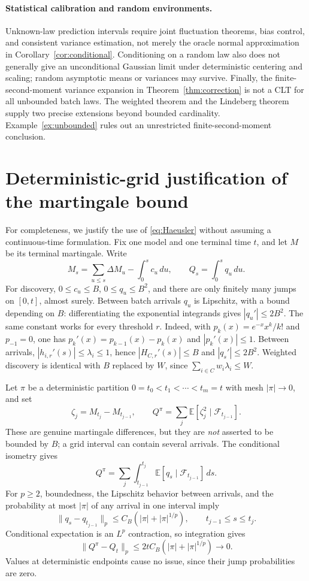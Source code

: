 \documentclass[11pt]{article}
\numberwithin{equation}{section}
\theoremstyle{definition}
\theoremstyle{remark}
\newcommand{\E}{\mathbb E}
\begin{document}
\paragraph{Statistical calibration and random environments.}
Unknown-law prediction intervals require joint fluctuation theorems, bias
control, and consistent variance estimation, not merely the oracle normal
approximation in Corollary~\ref{cor:conditional}. Conditioning on a random law
also does not generally give an unconditional Gaussian limit under deterministic
centering and scaling; random asymptotic means or variances may survive. Finally,
the finite-second-moment variance expansion in
Theorem~\ref{thm:correction} is not a CLT for all unbounded batch laws.
The weighted theorem and the Lindeberg theorem supply two precise extensions
beyond bounded cardinality. Example~\ref{ex:unbounded} rules out an
unrestricted finite-second-moment conclusion.

\appendix
\section{Deterministic-grid justification of the martingale bound}\label{app:mesh}

For completeness, we justify the use of \eqref{eq:Haeusler} without assuming a
continuous-time formulation. Fix one model and one terminal time $t$, and let
$M$ be its terminal martingale. Write
\[
 M_s=\sum_{u\le s}\Delta M_u-\int_0^s c_u\,du,
 \qquad Q_s=\int_0^s q_u\,du.
\]
For discovery, $0\le c_u\le B$, $0\le q_u\le B^2$, and there are only finitely
many jumps on $[0,t]$, almost surely. Between batch arrivals $q_u$ is Lipschitz,
with a bound depending on $B$: differentiating the exponential integrands gives
$|q_u'|\le2B^2$. The same constant works for every threshold $r$. Indeed, with
$p_k(x)=e^{-x}x^k/k!$ and $p_{-1}=0$, one has
$p_k'(x)=p_{k-1}(x)-p_k(x)$ and $|p_k'(x)|\le1$.
Between arrivals, $|h_{i,r}'(s)|\le\lambda_i\le1$, hence
$|H_{C,r}'(s)|\le B$ and $|q_s'|\le2B^2$.
Weighted discovery is identical with $B$ replaced by $W$, since
$\sum_{i\in C}w_i\lambda_i\le W$.

Let $\pi$ be a deterministic partition
$0=t_0<t_1<\cdots<t_m=t$ with mesh $|\pi|\to0$, and set
\[
 \zeta_j=M_{t_j}-M_{t_{j-1}},\qquad
 Q^\pi=\sum_j\E[\zeta_j^2\mid\mathcal F_{t_{j-1}}].
\]
These are genuine martingale differences, but they are \emph{not} asserted to
be bounded by $B$; a grid interval can contain several arrivals.
The conditional isometry gives
\[
 Q^\pi=\sum_j\int_{t_{j-1}}^{t_j}
                    \E[q_s\mid\mathcal F_{t_{j-1}}]\,ds.
\]
For $p\ge2$, boundedness, the Lipschitz behavior between arrivals, and the
probability at most $|\pi|$ of any arrival in one interval imply
\[
 \|q_s-q_{t_{j-1}}\|_p
 \le C_B(|\pi|+|\pi|^{1/p}),\qquad t_{j-1}\le s\le t_j.
\]
Conditional expectation is an $L^p$ contraction, so integration gives
\begin{equation}\label{eq:gridQlimit}
 \|Q^\pi-Q_t\|_p\le2tC_B(|\pi|+|\pi|^{1/p})\longrightarrow0.
\end{equation}
Values at deterministic endpoints cause no issue, since their jump
probabilities are zero.
\end{document}
